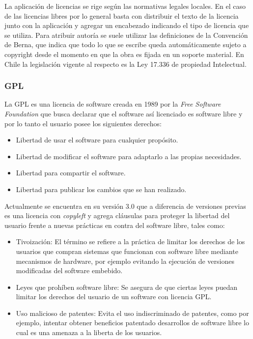 \documentclass[11pt,letterpaper]{article}
\begin{document}
La aplicación de licencias se rige según las normativas legales locales. En el caso de las licencias libres por lo general basta con distribuir el texto de la licencia junto con la aplicación y agregar un encabezado indicando el tipo de licencia que se utiliza. Para atribuir autoría se suele utilizar las definiciones de la Convención de Berna, que indica que todo lo que se escribe queda automáticamente sujeto a copyright desde el momento en que la obra es fijada en un soporte material\cite{GNU}. En Chile la legislación vigente al respecto es la Ley 17.336 de propiedad Intelectual.

\subsubsection{\ac{GPL}}
La \ac{GPL} es una licencia de software creada en 1989 por la \textit{Free Software Foundation} que busca declarar que el software así licenciado es software libre y por lo tanto el usuario posee los siguientes derechos\cite{GPL}:
\begin{itemize}
	\item Libertad de usar el software para cualquier propósito.
	\item Libertad de modificar el software para adaptarlo a las propias necesidades.
	\item Libertad para compartir el software.
	\item Libertad para publicar los cambios que se han realizado.
\end{itemize}

Actualmente se encuentra en su versión 3.0 que a diferencia de versiones previas es una licencia con \textit{copyleft} y agrega cláusulas para proteger la libertad del usuario frente a nuevas prácticas en contra del software libre, tales como\cite{GPL}:
\begin{itemize}
	\item Tivoización: El término se refiere a la práctica de limitar los derechos de los usuarios que compran sistemas que funcionan con software libre mediante mecanismos de hardware, por ejemplo evitando la ejecución de versiones modificadas del software embebido.
	\item Leyes que prohíben software libre: Se asegura de que ciertas leyes puedan limitar los derechos del usuario de un software con licencia \ac{GPL}.
	\item Uso malicioso de patentes: Evita el uso indiscriminado de patentes, como por ejemplo, intentar obtener beneficios patentado desarrollos de software libre lo cual es una amenaza a la liberta de los usuarios.
\end{itemize}
\end{document}
